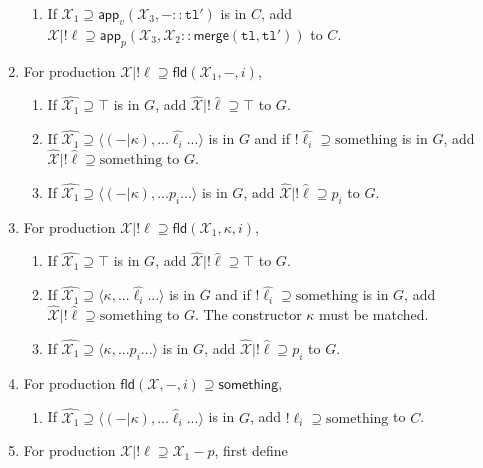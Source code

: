 \documentclass[a4paper]{article}
\newcommand*\vbar{|}
\begin{document}
\begin{enumerate}
\begin{enumerate}
        \item If $\mathcal{X_1}\supseteq\mathsf{app}_v(\mathcal{X}_3,-::\mathtt{tl}')$ is in $C$, add $\mathcal{X}\vbar!\ell\supseteq\mathsf{app}_p(\mathcal{X}_3,\mathcal{X_2}::\mathsf{merge}(\mathtt{tl},\mathtt{tl}'))$ to $C$.
    \end{enumerate}
    \item For production $\mathcal{X}\vbar!\ell\supseteq\mathsf{fld}(\mathcal{X}_1,-,i)$,
    \begin{enumerate}
        \item If $\hat{\mathcal{X}_1}\supseteq\top$ is in $G$, add $\hat{\mathcal{X}}\vbar!\hat{\ell}\supseteq\top$ to $G$.
        \item If $\hat{\mathcal{X}_1}\supseteq\langle(-\vbar\kappa),...\hat{\ell_i}...\rangle$ is in $G$ and if $!\hat{\ell_i}\supseteq\text{something}$ is in $G$, add $\hat{\mathcal{X}}\vbar!\hat{\ell}\supseteq\text{something}$ to $G$.
        \item If $\hat{\mathcal{X}_1}\supseteq\langle(-\vbar\kappa),...p_i...\rangle$ is in $G$, add $\hat{\mathcal{X}}\vbar!\hat{\ell}\supseteq p_i$ to $G$.
    \end{enumerate}    
    \item For production $\mathcal{X}\vbar!\ell\supseteq\mathsf{fld}(\mathcal{X}_1,\kappa,i)$,
    \begin{enumerate}
        \item If $\hat{\mathcal{X}_1}\supseteq\top$ is in $G$, add $\hat{\mathcal{X}}\vbar!\hat{\ell}\supseteq\top$ to $G$.
        \item If $\hat{\mathcal{X}_1}\supseteq\langle\kappa,...\hat{\ell_i}...\rangle$ is in $G$ and if $!\hat{\ell_i}\supseteq\text{something}$ is in $G$, add $\hat{\mathcal{X}}\vbar!\hat{\ell}\supseteq\text{something}$ to $G$. The constructor $\kappa$ must be matched.
        \item If $\hat{\mathcal{X}_1}\supseteq\langle\kappa,...p_i...\rangle$ is in $G$, add $\hat{\mathcal{X}}\vbar!\hat{\ell}\supseteq p_i$ to $G$.
    \end{enumerate}
    \item For production $\mathsf{fld}(\mathcal{X}, -, i)\supseteq\mathsf{something}$,
    \begin{enumerate}
        \item If $\hat{\mathcal{X}_1}\supseteq\langle(-\vbar\kappa),...\hat\ell_i...\rangle$ is in $G$, add $!\ell_i\supseteq\text{something}$ to $C$.
    \end{enumerate}
    \item For production $\mathcal{X}\vbar!\ell\supseteq\mathcal{X}_1-p$, first define

\end{enumerate}
\end{document}
